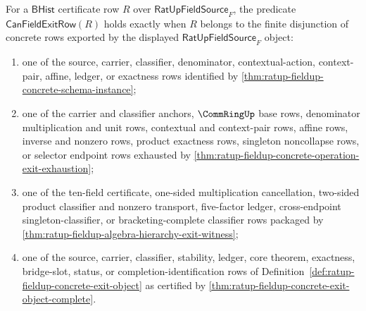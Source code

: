 \begin{definition}
\label{def:ratup-fieldup-canonical-exit-row-predicate}
For a $\mathsf{BHist}$ certificate row $R$ over
$\mathsf{RatUpFieldSource}_F$, the predicate
$\mathsf{CanFieldExitRow}(R)$ holds exactly when $R$ belongs to the finite
disjunction of concrete rows exported by the displayed
$\mathsf{RatUpFieldSource}_F$ object:
\begin{enumerate}
  \item one of the source, carrier, classifier, denominator, contextual-action,
  context-pair, affine, ledger, or exactness rows identified by
  \autoref{thm:ratup-fieldup-concrete-schema-instance};
  \item one of the carrier and classifier anchors, $\CommRingUp$ base rows,
  denominator multiplication and unit rows, contextual and context-pair rows,
  affine rows, inverse and nonzero rows, product exactness rows, singleton
  noncollapse rows, or selector endpoint rows exhausted by
  \autoref{thm:ratup-fieldup-concrete-operation-exit-exhaustion};
  \item one of the ten-field certificate, one-sided multiplication cancellation,
  two-sided product classifier and nonzero transport, five-factor ledger,
  cross-endpoint singleton-classifier, or bracketing-complete classifier rows
  packaged by \autoref{thm:ratup-fieldup-algebra-hierarchy-exit-witness};
  \item one of the source, carrier, classifier, stability, ledger, core theorem,
  exactness, bridge-slot, status, or completion-identification rows of
  Definition~\ref{def:ratup-fieldup-concrete-exit-object} as certified by
  \autoref{thm:ratup-fieldup-concrete-exit-object-complete}.
\end{enumerate}
\end{definition}

